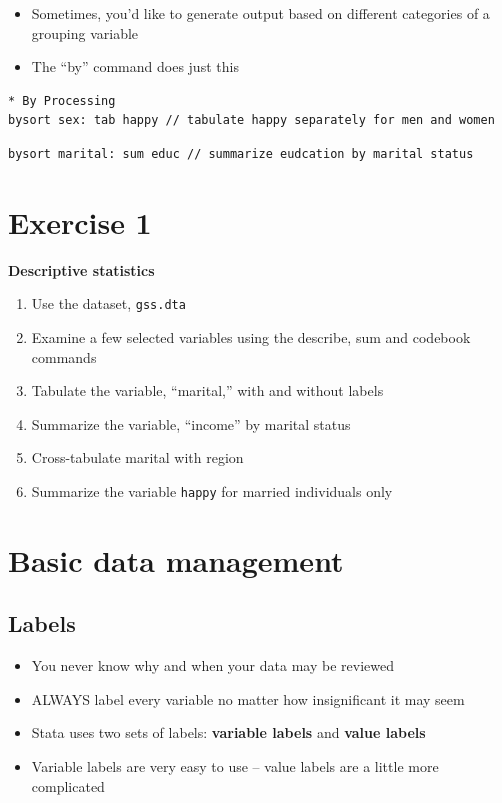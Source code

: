 \documentclass[]{book}
\providecommand{\tightlist}{%
  \setlength{\itemsep}{0pt}\setlength{\parskip}{0pt}}
\begin{document}
\begin{itemize}
\tightlist
\item
  Sometimes, you'd like to generate output based on different categories
  of a grouping variable
\item
  The ``by'' command does just this
\end{itemize}

\begin{verbatim}
* By Processing
bysort sex: tab happy // tabulate happy separately for men and women
\end{verbatim}

\begin{verbatim}
bysort marital: sum educ // summarize eudcation by marital status
\end{verbatim}

\section{Exercise 1}\label{exercise-1-4}

\textbf{Descriptive statistics}

\begin{enumerate}
\def\labelenumi{\arabic{enumi}.}
\tightlist
\item
  Use the dataset, \texttt{gss.dta}
\item
  Examine a few selected variables using the describe, sum and codebook
  commands
\item
  Tabulate the variable, ``marital,'' with and without labels
\item
  Summarize the variable, ``income'' by marital status
\item
  Cross-tabulate marital with region
\item
  Summarize the variable \texttt{happy} for married individuals only
\end{enumerate}

\section{Basic data management}\label{basic-data-management}

\subsection{Labels}\label{labels}

\begin{itemize}
\tightlist
\item
  You never know why and when your data may be reviewed
\item
  ALWAYS label every variable no matter how insignificant it may seem
\item
  Stata uses two sets of labels: \textbf{variable labels} and
  \textbf{value labels}
\item
  Variable labels are very easy to use -- value labels are a little more
  complicated
\end{itemize}
\end{document}
